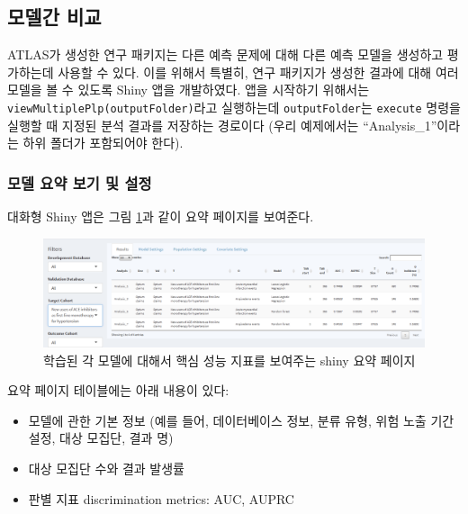 \documentclass[10.5pt]{book}
\providecommand{\tightlist}{%
  \setlength{\itemsep}{0pt}\setlength{\parskip}{0pt}}
\theoremstyle{definition}
\theoremstyle{definition}
\theoremstyle{definition}
\theoremstyle{remark}
\begin{document}
\subsection{모델간 비교}\label{-}

ATLAS가 생성한 연구 패키지는 다른 예측 문제에 대해 다른 예측 모델을
생성하고 평가하는데 사용할 수 있다. 이를 위해서 특별히, 연구 패키지가
생성한 결과에 대해 여러 모델을 볼 수 있도록 Shiny 앱을 개발하였다. 앱을
시작하기 위해서는 \texttt{viewMultiplePlp(outputFolder)}라고 실행하는데
\texttt{outputFolder}는 \texttt{execute} 명령을 실행할 때 지정된 분석
결과를 저장하는 경로이다 (우리 예제에서는 ``Analysis\_1''이라는 하위
폴더가 포함되어야 한다).

\subsubsection*{모델 요약 보기 및 설정}\label{----}

대화형 Shiny 앱은 그림 \ref{fig:multiShinySummary}과 같이 요약 페이지를
보여준다.

\begin{figure}

{\centering \includegraphics[width=1\linewidth]{images/PatientLevelPrediction/shiny/shinyFilter} 

}

\caption{학습된 각 모델에 대해서 핵심 성능 지표를 보여주는 shiny 요약 페이지}\label{fig:multiShinySummary}
\end{figure}

요약 페이지 테이블에는 아래 내용이 있다:

\begin{itemize}
\tightlist
\item
  모델에 관한 기본 정보 (예를 들어, 데이터베이스 정보, 분류 유형, 위험
  노출 기간 설정, 대상 모집단, 결과 명)
\item
  대상 모집단 수와 결과 발생률
\item
  판별 지표 discrimination metrics: AUC, AUPRC
\end{itemize}
\end{document}
